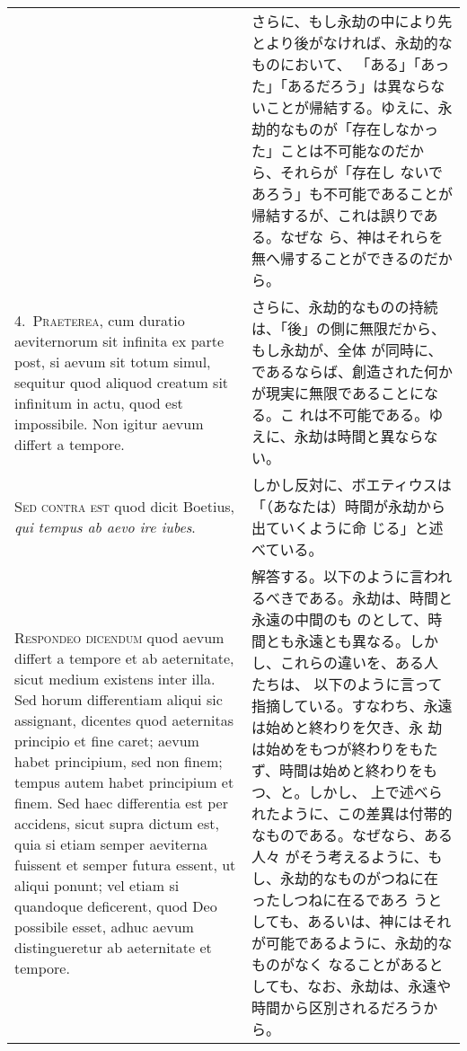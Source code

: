 \documentclass[10pt]{jsarticle} %
\begin{document}
\begin{longtable}{p{21em}p{21em}}
&

さらに、もし永劫の中により先とより後がなければ、永劫的なものにおいて、
「ある」「あった」「あるだろう」は異ならないことが帰結する。ゆえに、永
劫的なものが「存在しなかった」ことは不可能なのだから、それらが「存在し
ないであろう」も不可能であることが帰結するが、これは誤りである。なぜな
ら、神はそれらを無へ帰することができるのだから。



\\


4.~{\scshape Praeterea}, cum duratio aeviternorum sit infinita ex parte
 post, si aevum sit totum simul, sequitur quod aliquod creatum sit
 infinitum in actu, quod est impossibile. Non igitur aevum differt a
 tempore.


&

さらに、永劫的なものの持続は、「後」の側に無限だから、もし永劫が、全体
が同時に、であるならば、創造された何かが現実に無限であることになる。こ
れは不可能である。ゆえに、永劫は時間と異ならない。

\\


{\scshape Sed contra est} quod dicit Boetius, {\itshape qui tempus ab
 aevo ire iubes}.


&

しかし反対に、ボエティウスは「（あなたは）時間が永劫から出ていくように命
じる」と述べている。


\\


{\scshape Respondeo dicendum} quod aevum differt a tempore et ab
aeternitate, sicut medium existens inter illa. Sed horum differentiam
aliqui sic assignant, dicentes quod aeternitas principio et fine caret;
aevum habet principium, sed non finem; tempus autem habet principium et
finem. Sed haec differentia est per accidens, sicut supra dictum est,
quia si etiam semper aeviterna fuissent et semper futura essent, ut
aliqui ponunt; vel etiam si quandoque deficerent, quod Deo possibile
esset, adhuc aevum distingueretur ab aeternitate et tempore.

&

解答する。以下のように言われるべきである。永劫は、時間と永遠の中間のも
のとして、時間とも永遠とも異なる。しかし、これらの違いを、ある人たちは、
以下のように言って指摘している。すなわち、永遠は始めと終わりを欠き、永
劫は始めをもつが終わりをもたず、時間は始めと終わりをもつ、と。しかし、
上で述べられたように、この差異は付帯的なものである。なぜなら、ある人々
がそう考えるように、もし、永劫的なものがつねに在ったしつねに在るであろ
うとしても、あるいは、神にはそれが可能であるように、永劫的なものがなく
なることがあるとしても、なお、永劫は、永遠や時間から区別されるだろうか
ら。


\end{longtable}
\end{document}
